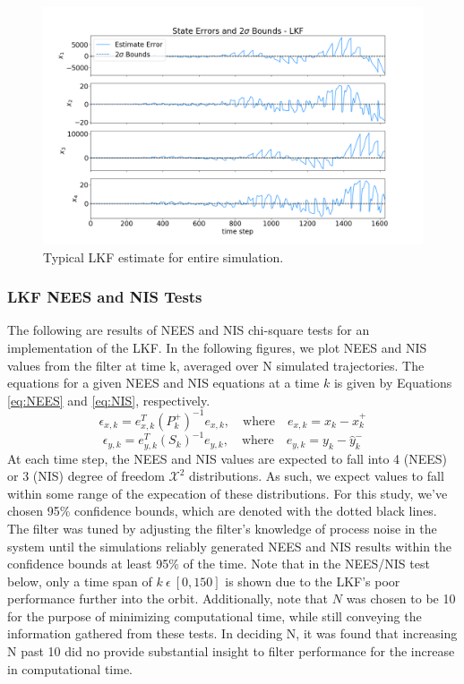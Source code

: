 \documentclass[11pt, a4paper]{article}
\begin{document}
\begin{figure}[H]
	\centering
	\includegraphics[width=\textwidth]{Figures/lkf_estimate_th.png}
	\caption{Typical LKF estimate for entire simulation.}
	\label{fig:lkf_est}
\end{figure}

\subsubsection{LKF NEES and NIS Tests}
The following are results of NEES and NIS chi-square tests for an implementation of the LKF. 
In the following figures, we plot NEES and NIS values from the filter at time k, averaged over N simulated trajectories. 
The equations for a given NEES and NIS equations at a time $k$ is given by Equations \ref{eq:NEES} and \ref{eq:NIS}, respectively.
\begin{equation}
	\epsilon_{x,k} = e^T_{x,k} (P^+_k)^{-1} e_{x,k},
	\quad \text{where} \quad
	e_{x,k} = x_k - \hat{x}^+_k
	\label{eq:NEES}
\end{equation}
\begin{equation}
	\epsilon_{y,k} = e^T_{y,k} (S_k)^{-1} e_{y,k},
	\quad \text{where} \quad
	e_{y,k} = y_k - \hat{y}^-_k
	\label{eq:NIS}
\end{equation}
At each time step, the NEES and NIS values are expected to fall into 4 (NEES) or 3 (NIS) degree of freedom $\mathcal{X}^2$ distributions. 
As such, we expect values to fall within some range of the expecation of these distributions. 
For this study, we've chosen 95\% confidence bounds, which are denoted with the dotted black lines. 
The filter was tuned by adjusting the filter's knowledge of process noise in the system until the simulations reliably generated NEES and NIS results within the confidence bounds at least 95\% of the time. 
Note that in the NEES/NIS test below, only a time span of $k\ \epsilon\ [0, 150]$ is shown due to the LKF's poor performance further into the orbit. 
Additionally, note that $N$ was chosen to be 10 for the purpose of minimizing computational time, while still conveying the information gathered from these tests. In deciding N, it was found that increasing N past 10 did no provide substantial insight to filter performance for the increase in computational time. 
\end{document}

